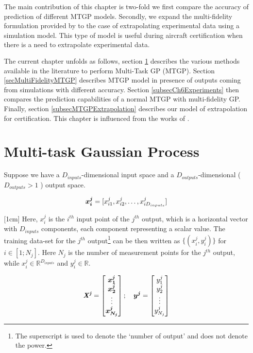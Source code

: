 The main contribution of this chapter is two-fold we first compare the accuracy of prediction of different MTGP models. Secondly, we expand the multi-fidelity formulation provided by \cite{kennedy2000predicting} to the case of extrapolating experimental data using a simulation model. This type of model is useful during aircraft certification when there is a need to extrapolate experimental data.   

The current chapter unfolds as follows, section \ref{secMTGP} describes the various methods available in the literature to perform Multi-Task GP (MTGP). Section \ref{secMultiFidelityMTGP} describes MTGP model in presence of outputs coming from simulations with different accuracy. Section \ref{subsecCh6Experiments} then compares the prediction capabilities of a normal MTGP with multi-fidelity GP. Finally, section \ref{subsecMTGPExtrapolation} describes our model of extrapolation for certification. This chapter is influenced from the works of \cite{forrester2007multi, alvarez2011kernels, bonilla_multi-task_2008, Boyle05dependentgaussian, kennedy2000predicting, le2013multi}.

\section{Multi-task Gaussian Process}\label{secMTGP}
Suppose we have a \(D_{inputs}\)-dimensional input space and a \(D_{outputs}\)-dimensional (\(D_{outputs} > 1\) )  output space. 

\begin{equation}\label{eqInitialInputPoint}
        \boldsymbol{x_{i}^{j}} = [x_{i1}^{j}, x_{i2}^{j}, \ldots, x_{iD_{inputs}}^{j}]
\end{equation}

[1cm]
Here, $x_{i}^{j}$ is the $i^{th}$ input point of the $j^{th}$ output, which is a horizontal vector with $D_{inputs}$ components, each component representing a scalar value. The training data-set for the \(j^{th}\) output\footnote{The superscript is used to denote the `number of output' and does not denote the power.} can be then written as \(\{(x_{i}^{j}, y_{i}^{j})\}\) for \(i \in [1; N_{j}]\). Here \(N_{j}\) is the number of measurement points for the \(j^{th}\) output, while \(x_{i}^{j} \in \mathbb{R}^{D_{inputs}}\) and \(y_{i}^{j} \in \mathbb{R}\). 

\begin{equation}
        \bm{\mathit{X^j}} = \begin{bmatrix}
\boldsymbol{x_1^j}\\ 
\boldsymbol{x_2^j}\\ 
\vdots\\ 
\boldsymbol{x_{N_j}^j}
\end{bmatrix} ; \quad 
\boldsymbol{y^j} = \begin{bmatrix}
y_1^j\\ 
y_2^j\\ 
\vdots\\ 
y_{N_j}^j
\end{bmatrix}
\end{equation}

